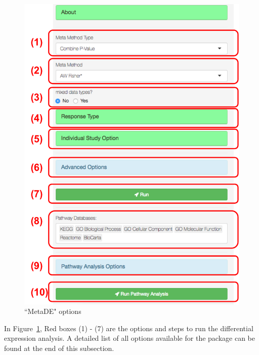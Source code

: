 \begin{figure}[H]
\begin{center}
\includegraphics[scale=0.5]{./figure/metaDE/metaDEoption.pdf}
\caption{``MetaDE" options}
\label{fig:MetaDEoption}
\end{center}
\end{figure}

In Figure~\ref{fig:MetaDEoption},
{\color{red} Red boxes (1) - (7)} are the options and steps to run the differential expression analysis.
A detailed list of all options available for the package can be found at the end of this subsection. 

